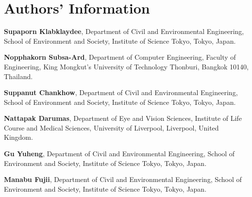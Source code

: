\documentclass[journal=jcisd8]{achemso}
\begin{document}
\section*{Authors' Information}

\textbf{Supaporn Klabklaydee}, Department of Civil and Environmental Engineering,
School of Environment and Society, Institute of Science Tokyo, Tokyo, Japan.

\textbf{Nopphakorn Subsa-Ard}, Department of Computer Engineering,
Faculty of Engineering, King Mongkut's University of Technology Thonburi,
Bangkok 10140, Thailand.

\textbf{Suppanut Chankhow}, Department of Civil and Environmental Engineering,
School of Environment and Society, Institute of Science Tokyo, Tokyo, Japan.

\textbf{Nattapak Darumas}, Department of Eye and Vision Sciences,
Institute of Life Course and Medical Sciences, University of Liverpool,
Liverpool, United Kingdom.

\textbf{Gu Yuheng}, Department of Civil and Environmental Engineering,
School of Environment and Society, Institute of Science Tokyo, Tokyo, Japan.

\textbf{Manabu Fujii}, Department of Civil and Environmental Engineering,
School of Environment and Society, Institute of Science Tokyo, Tokyo, Japan.
\end{document}
